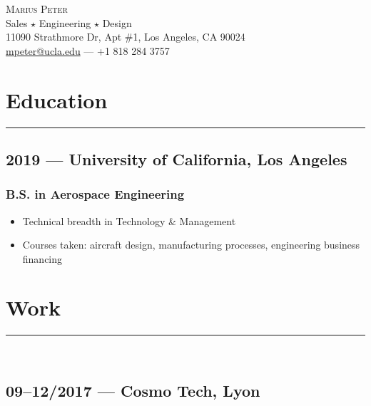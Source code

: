 \documentclass[10pt]{report}
\begin{document}
\centering
\huge \textsc{Marius Peter}\\[0.2cm]
\Large Sales $\star$ Engineering $\star$ Design\\[0.2cm]

\normalsize
11090 Strathmore Dr, Apt \#1,
Los Angeles, CA 90024\\
\href{mailto:mpeter@ucla.edu}{mpeter@ucla.edu} --- +1 818 284 3757\\


\section*{Education}
\rule{\linewidth}{1pt}
\subsection*{2019 --- University of California, Los Angeles}
\subsubsection*{B.S. in Aerospace Engineering}
\begin{itemize}
    \item Technical breadth in Technology \& Management
    \item Courses taken: aircraft design, manufacturing processes, engineering business financing
\end{itemize}

\section*{Work}
\rule{\linewidth}{1pt}\\
\subsection*{09--12/2017 --- Cosmo Tech, Lyon}
\end{document}
